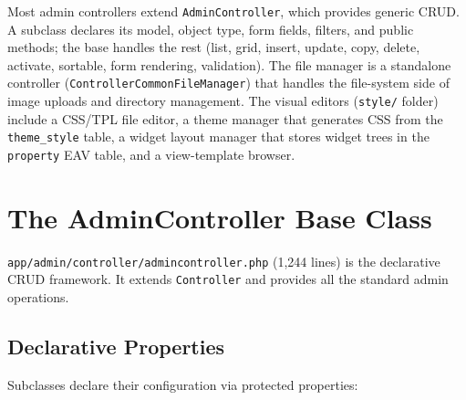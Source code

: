 \documentclass[11pt,a4paper]{article}
\begin{document}
Most admin controllers extend \texttt{AdminController}, which provides
generic CRUD. A subclass declares its model, object type, form fields,
filters, and public methods; the base handles the rest (list, grid,
insert, update, copy, delete, activate, sortable, form rendering,
validation). The file manager is a standalone controller
(\texttt{ControllerCommonFileManager}) that handles the file-system
side of image uploads and directory management. The visual editors
(\texttt{style/} folder) include a CSS/TPL file editor, a theme
manager that generates CSS from the \texttt{theme\_style} table, a
widget layout manager that stores widget trees in the
\texttt{property} EAV table, and a view-template browser.

\section{The AdminController Base Class}\label{sec:admin-controller}

\texttt{app/admin/controller/admincontroller.php} (1,244 lines) is the
declarative CRUD framework. It extends \texttt{Controller} and provides
all the standard admin operations.

\subsection{Declarative Properties}

Subclasses declare their configuration via protected properties:
\end{document}

